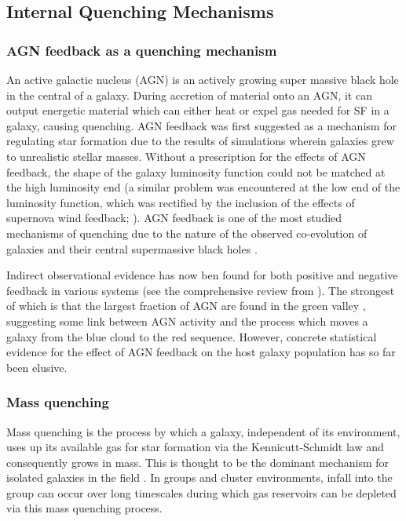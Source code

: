 \subsection{Internal Quenching Mechanisms}\label{sec:intquench}

\subsubsection{AGN feedback as a quenching mechanism}\label{sec:agnquench}

An active galactic nucleus (AGN) is an actively growing super massive black hole in the central of a galaxy. During accretion of material onto an AGN, it can output energetic material which can either heat or expel gas needed for SF in a galaxy, causing quenching. AGN feedback was first suggested as a mechanism for regulating star formation due to the results of simulations \citep{silk98, Croton06, Bower06, somerville08} wherein galaxies grew to unrealistic stellar masses. Without a prescription for the effects of AGN feedback, the shape of the galaxy luminosity function \citep{} could not be matched at the high luminosity end (a similar problem was encountered at the low end of the luminosity function, which was rectified by the inclusion of the effects of supernova wind feedback; \citealt{}). AGN feedback is one of the most studied mechanisms of quenching due to the nature of the observed co-evolution of galaxies and their central supermassive black holes \citep{magorrian98, marconi03, haringrix04}. 

Indirect observational evidence has now ben found for both positive and negative feedback in various systems (see the comprehensive review from \citealt{fabian12}). The strongest of which is that the largest fraction of AGN are found in the green valley \citep{cowie08, Hickox09, schawinski10a}, suggesting some link between AGN activity and the process which moves a galaxy from the blue cloud to the red sequence. However, concrete statistical evidence for the effect of AGN feedback on the host galaxy population has so far been elusive.


\subsubsection{Mass quenching}\label{sec:massquench}
Mass quenching is the process by which a galaxy, independent of its environment, uses up its available gas for star formation via the Kennicutt-Schmidt law \citep{schmidt59, kennicutt98} and consequently grows in mass. This is thought to be the dominant mechanism for isolated galaxies in the field \citep{kormendy04}. In groups and cluster environments, infall into the group can occur over long timescales during which gas reservoirs can be depleted via this mass quenching process.
 
